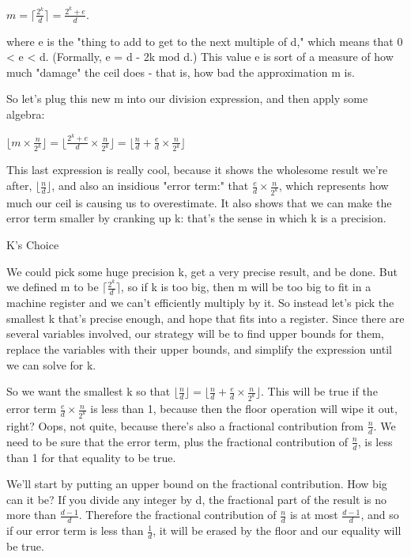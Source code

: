 $m = \lceil \frac {2^k} d \rceil = \frac {2^k + e} d$.

where e is the "thing to add to get to the next multiple of d," which means that 0 < e < d. (Formally, e = d - 2k mod d.) This value e is sort of a measure of how much "damage" the ceil does - that is, how bad the approximation m is.

So let's plug this new m into our division expression, and then apply some algebra:

$\lfloor m \times \frac n {2^k} \rfloor = \lfloor \frac {2^k + e} d \times \frac n {2^k} \rfloor = \lfloor \frac n d + \frac e d \times \frac n {2^k} \rfloor $

This last expression is really cool, because it shows the wholesome result we're after, $\lfloor \frac n d \rfloor$, and also an insidious "error term:" that $\frac e d \times \frac n {2^k}$, which represents how much our ceil is causing us to overestimate. It also shows that we can make the error term smaller by cranking up k: that's the sense in which k is a precision.
 
K's Choice

We could pick some huge precision k, get a very precise result, and be done. But we defined m to be $\lceil \frac {2^k} d \rceil$, so if k is too big, then m will be too big to fit in a machine register and we can't efficiently multiply by it. So instead let's pick the smallest k that's precise enough, and hope that fits into a register. Since there are several variables involved, our strategy will be to find upper bounds for them, replace the variables with their upper bounds, and simplify the expression until we can solve for k.

So we want the smallest k so that $\lfloor \frac n d \rfloor = \lfloor \frac n d + \frac e d \times \frac n {2^k} \rfloor $. This will be true if the error term $\frac e d \times \frac n {2^k}$ is less than 1, because then the floor operation will wipe it out, right? Oops, not quite, because there's also a fractional contribution from $\frac n d$. We need to be sure that the error term, plus the fractional contribution of $\frac n d$, is less than 1 for that equality to be true.

We'll start by putting an upper bound on the fractional contribution. How big can it be? If you divide any integer by d, the fractional part of the result is no more than $\frac {d - 1} d$. Therefore the fractional contribution of $\frac n d$ is at most $\frac {d - 1} d$, and so if our error term is less than $\frac 1 d$, it will be erased by the floor and our equality will be true.

